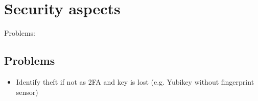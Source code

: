 \section{Security aspects}

Problems: \cite{paragon-webauth}

\subsection{Problems}

\begin{itemize}
	\item Identify theft if not as 2FA and key is lost (e.g. Yubikey without fingerprint sensor)
\end{itemize}